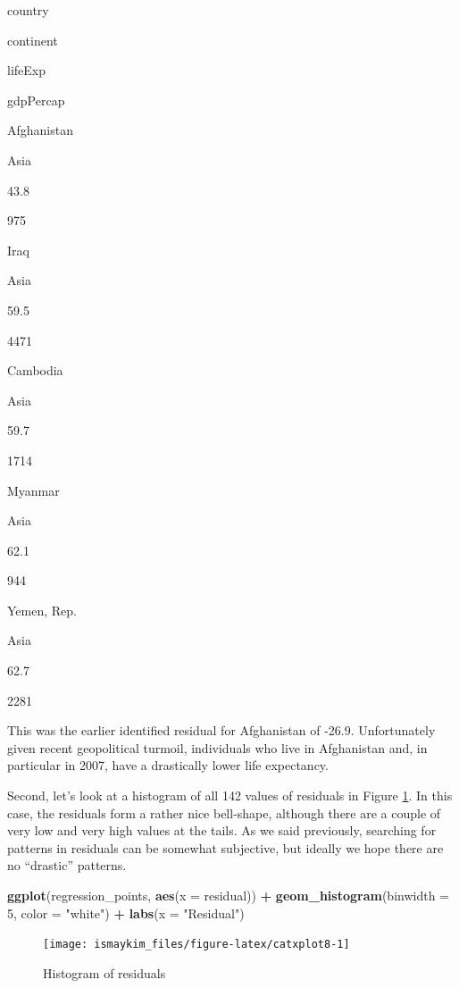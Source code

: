 \documentclass[12pt,]{krantz}
\makeatletter
\newenvironment{Shaded}{\begin{snugshade}}{\end{snugshade}}
\newcommand{\KeywordTok}[1]{\textcolor[rgb]{0.27,0.27,0.27}{\textbf{#1}}}
\newcommand{\DataTypeTok}[1]{\textcolor[rgb]{0.27,0.27,0.27}{#1}}
\newcommand{\DecValTok}[1]{\textcolor[rgb]{0.06,0.06,0.06}{#1}}
\newcommand{\StringTok}[1]{\textcolor[rgb]{0.5,0.5,0.5}{#1}}
\newcommand{\OperatorTok}[1]{\textcolor[rgb]{0.43,0.43,0.43}{\textbf{#1}}}
\newcommand{\NormalTok}[1]{#1}
\newenvironment{kframe}{%
\medskip{}
\setlength{\fboxsep}{.8em}
 \def\at@end@of@kframe{}%
 \ifinner\ifhmode%
  \def\at@end@of@kframe{\end{minipage}}%
  \begin{minipage}{\columnwidth}%
 \fi\fi%
 \def\FrameCommand##1{\hskip\@totalleftmargin \hskip-\fboxsep
 \colorbox{shadecolor}{##1}\hskip-\fboxsep
     \hskip-\linewidth \hskip-\@totalleftmargin \hskip\columnwidth}%
 \MakeFramed {\advance\hsize-\width
   \@totalleftmargin\z@ \linewidth\hsize
   \@setminipage}}%
 {\par\unskip\endMakeFramed%
 \at@end@of@kframe}
\renewenvironment{Shaded}{\begin{kframe}}{\end{kframe}}
\makeatother
\begin{document}
country

continent

lifeExp

gdpPercap

Afghanistan

Asia

43.8

975

Iraq

Asia

59.5

4471

Cambodia

Asia

59.7

1714

Myanmar

Asia

62.1

944

Yemen, Rep.

Asia

62.7

2281

This was the earlier identified residual for Afghanistan of -26.9.
Unfortunately given recent geopolitical turmoil, individuals who live in
Afghanistan and, in particular in 2007, have a drastically lower life
expectancy.

Second, let's look at a histogram of all 142 values of residuals in
Figure \ref{fig:catxplot8}. In this case, the residuals form a rather
nice bell-shape, although there are a couple of very low and very high
values at the tails. As we said previously, searching for patterns in
residuals can be somewhat subjective, but ideally we hope there are no
``drastic'' patterns.

\begin{Shaded}
\begin{Highlighting}[]
\KeywordTok{ggplot}\NormalTok{(regression_points, }\KeywordTok{aes}\NormalTok{(}\DataTypeTok{x =}\NormalTok{ residual)) }\OperatorTok{+}
\StringTok{  }\KeywordTok{geom_histogram}\NormalTok{(}\DataTypeTok{binwidth =} \DecValTok{5}\NormalTok{, }\DataTypeTok{color =} \StringTok{"white"}\NormalTok{) }\OperatorTok{+}
\StringTok{  }\KeywordTok{labs}\NormalTok{(}\DataTypeTok{x =} \StringTok{"Residual"}\NormalTok{)}
\end{Highlighting}
\end{Shaded}

\begin{figure}

{\centering \texttt{[image: ismaykim\_files/figure-latex/catxplot8-1]} 

}

\caption{Histogram of residuals}\label{fig:catxplot8}
\end{figure}
\end{document}
